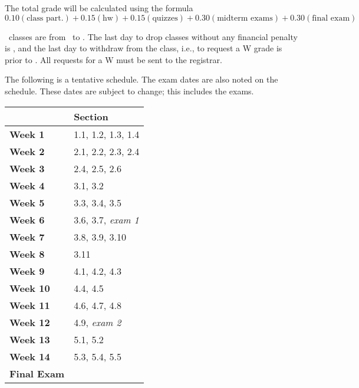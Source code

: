 \documentclass{assets/syllabus}
\begin{document}

The total grade will be calculated using the formula
\[
  0.10 (\textrm{class part.}) +
  0.15 (\textrm{hw}) +
  0.15 (\textrm{quizzes}) +
  0.30 (\textrm{midterm exams}) +
  0.30 (\textrm{final exam})
\]


\Semester\ classes are from \Startsemesterclasses\
to \Endsemesterclasses.  The last day to drop
classes without any financial penalty is
\Addanddrop, and the last day to withdraw from the
class, i.e., to request a {\ec W} grade is prior
to \Lastdropdate.  All requests for a W must be
sent to the registrar.

The following is a tentative schedule. The exam dates are
also noted on the schedule. These dates are subject to
change; this includes the exams.

\begin{center}
  \begin{tabular}{|l l|}
    \hline
    \rowcolor{cyan!30}{\textbf{Dates}} & \textbf{Section} \\ 
    \hline
    {\bf Week 1}  & 1.1, 1.2, 1.3, 1.4 \\
    {\bf Week 2}  & 2.1, 2.2, 2.3, 2.4 \\
    {\bf Week 3}  & 2.4, 2.5, 2.6 \\
    {\bf Week 4}  & 3.1, 3.2 \\
    {\bf Week 5}  & 3.3, 3.4, 3.5 \\
    {\bf Week 6}  & 3.6, 3.7, \emph{exam 1} \\
    {\bf Week 7}  & 3.8, 3.9, 3.10 \\
    {\bf Week 8}  & 3.11 \\
    {\bf Week 9}  & 4.1, 4.2, 4.3 \\
    {\bf Week 10} & 4.4, 4.5 \\
    {\bf Week 11} & 4.6, 4.7, 4.8 \\
    {\bf Week 12} & 4.9, \emph{exam 2} \\
    {\bf Week 13} & 5.1, 5.2 \\
    {\bf Week 14} & 5.3, 5.4, 5.5 \\
    \hline
    {\bf Final Exam} & \Semesterfinalexam \\
    \hline
  \end{tabular}
\end{center}


{
\renewcommand{\syllabusfontstable}{\syllabusfontf}
\renewcommand{\tableheader}{\tableheaders}
%
}

\LastPage
\end{document}
